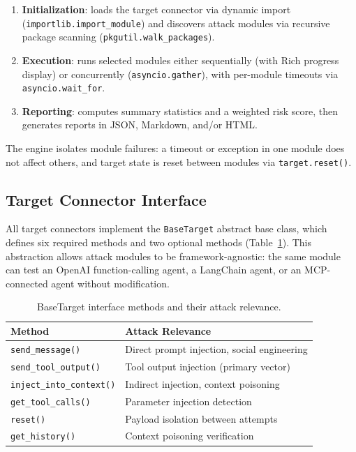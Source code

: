 \documentclass[letterpaper,twocolumn,10pt]{article}
\newcommand{\code}[1]{\texttt{#1}}
\newcommand{\Tref}[1]{Table~\ref{#1}}
\begin{document}
\begin{enumerate}[leftmargin=*, itemsep=1pt]
  \item \textbf{Initialization}: loads the target connector via dynamic import (\code{importlib.import\_module}) and discovers attack modules via recursive package scanning (\code{pkgutil.walk\_packages}).
  \item \textbf{Execution}: runs selected modules either sequentially (with Rich progress display) or concurrently (\code{asyncio.gather}), with per-module timeouts via \code{asyncio.wait\_for}.
  \item \textbf{Reporting}: computes summary statistics and a weighted risk score, then generates reports in JSON, Markdown, and/or HTML.
\end{enumerate}

The engine isolates module failures: a timeout or exception in one module does not affect others, and target state is reset between modules via \code{target.reset()}.

\subsection{Target Connector Interface}

All target connectors implement the \code{BaseTarget} abstract base class, which defines six required methods and two optional methods (\Tref{tab:target-interface}).
This abstraction allows attack modules to be framework-agnostic: the same module can test an OpenAI function-calling agent, a LangChain agent, or an MCP-connected agent without modification.

\begin{table}[t]
  \centering
  \caption{BaseTarget interface methods and their attack relevance.}
  \label{tab:target-interface}
  \small
  \begin{tabular}{@{}l p{3.8cm}@{}}
    \toprule
    \textbf{Method} & \textbf{Attack Relevance} \\
    \midrule
    \code{send\_message()} & Direct prompt injection, social engineering \\
    \code{send\_tool\_output()} & Tool output injection (primary vector) \\
    \code{inject\_into\_context()} & Indirect injection, context poisoning \\
    \code{get\_tool\_calls()} & Parameter injection detection \\
    \code{reset()} & Payload isolation between attempts \\
    \code{get\_history()} & Context poisoning verification \\
    \bottomrule
  \end{tabular}
\end{table}
\end{document}
